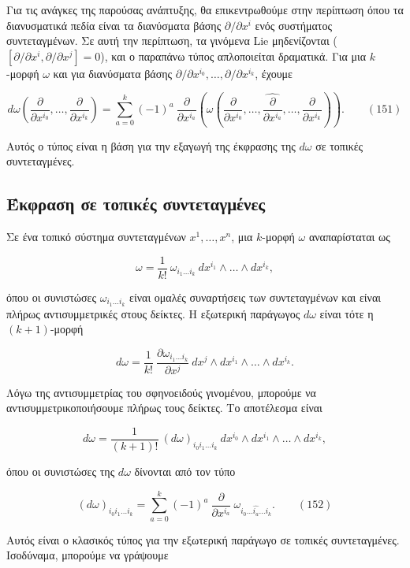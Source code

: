 \documentclass[12pt]{article}
\begin{document}
Για τις ανάγκες της παρούσας ανάπτυξης, θα επικεντρωθούμε στην περίπτωση όπου τα διανυσματικά πεδία είναι τα διανύσματα βάσης $\partial / \partial x^i$ ενός συστήματος συντεταγμένων. Σε αυτή την περίπτωση, τα γινόμενα Lie μηδενίζονται ($[\partial / \partial x^i, \partial / \partial x^j] = 0$), και ο παραπάνω τύπος απλοποιείται δραματικά. Για μια $k$-μορφή $\omega$ και για διανύσματα βάσης $\partial / \partial x^{i_0}, \dots, \partial / \partial x^{i_k}$, έχουμε

\[
d\omega \left( \frac{\partial}{\partial x^{i_0}}, \dots, \frac{\partial}{\partial x^{i_k}} \right) = \sum_{a=0}^{k} (-1)^a \ \frac{\partial}{\partial x^{i_a}} \left( \omega \left( \frac{\partial}{\partial x^{i_0}}, \dots, \widehat{\frac{\partial}{\partial x^{i_a}}}, \dots, \frac{\partial}{\partial x^{i_k}} \right) \right). \qquad (151)
\]

Αυτός ο τύπος είναι η βάση για την εξαγωγή της έκφρασης της $d\omega$ σε τοπικές συντεταγμένες.

\subsection{Έκφραση σε τοπικές συντεταγμένες}

Σε ένα τοπικό σύστημα συντεταγμένων $x^1, \dots, x^n$, μια $k$-μορφή $\omega$ αναπαρίσταται ως

\[
\omega = \frac{1}{k!} \ \omega_{i_1 \dots i_k} \ dx^{i_1} \wedge \dots \wedge dx^{i_k},
\]

όπου οι συνιστώσες $\omega_{i_1 \dots i_k}$ είναι ομαλές συναρτήσεις των συντεταγμένων και είναι πλήρως αντισυμμετρικές στους δείκτες. Η εξωτερική παράγωγος $d\omega$ είναι τότε η $(k+1)$-μορφή

\[
d\omega = \frac{1}{k!} \ \frac{\partial \omega_{i_1 \dots i_k}}{\partial x^j} \ dx^j \wedge dx^{i_1} \wedge \dots \wedge dx^{i_k}.
\]

Λόγω της αντισυμμετρίας του σφηνοειδούς γινομένου, μπορούμε να αντισυμμετρικοποιήσουμε πλήρως τους δείκτες. Το αποτέλεσμα είναι

\[
d\omega = \frac{1}{(k+1)!} \ (d\omega)_{i_0 i_1 \dots i_k} \ dx^{i_0} \wedge dx^{i_1} \wedge \dots \wedge dx^{i_k},
\]

όπου οι συνιστώσες της $d\omega$ δίνονται από τον τύπο

\[
(d\omega)_{i_0 i_1 \dots i_k} = \sum_{a=0}^{k} (-1)^a \ \frac{\partial}{\partial x^{i_a}} \ \omega_{i_0 \dots \widehat{i_a} \dots i_k}. \qquad (152)
\]

Αυτός είναι ο κλασικός τύπος για την εξωτερική παράγωγο σε τοπικές συντεταγμένες. Ισοδύναμα, μπορούμε να γράψουμε
\end{document}

